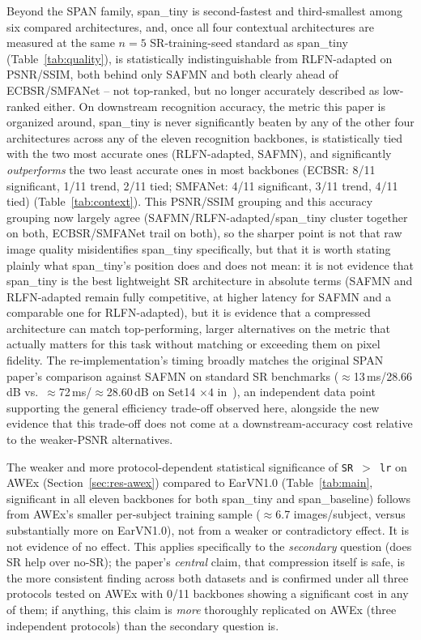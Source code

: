 \documentclass[11pt]{article}
\begin{document}
\label{sec:disc-position}
Beyond the SPAN family, span\_tiny is second-fastest and third-smallest among six compared architectures, and, once all four contextual architectures are measured at the same $n=5$ SR-training-seed standard as span\_tiny (Table~\ref{tab:quality}), is statistically indistinguishable from RLFN-adapted on PSNR/SSIM, both behind only SAFMN and both clearly ahead of ECBSR/SMFANet -- not top-ranked, but no longer accurately described as low-ranked either. On downstream recognition accuracy, the metric this paper is organized around, span\_tiny is never significantly beaten by any of the other four architectures across any of the eleven recognition backbones, is statistically tied with the two most accurate ones (RLFN-adapted, SAFMN), and significantly \emph{outperforms} the two least accurate ones in most backbones (ECBSR: 8/11 significant, 1/11 trend, 2/11 tied; SMFANet: 4/11 significant, 3/11 trend, 4/11 tied) (Table~\ref{tab:context}). This PSNR/SSIM grouping and this accuracy grouping now largely agree (SAFMN/RLFN-adapted/span\_tiny cluster together on both, ECBSR/SMFANet trail on both), so the sharper point is not that raw image quality misidentifies span\_tiny specifically, but that it is worth stating plainly what span\_tiny's position does and does not mean: it is not evidence that span\_tiny is the best lightweight SR architecture in absolute terms (SAFMN and RLFN-adapted remain fully competitive, at higher latency for SAFMN and a comparable one for RLFN-adapted), but it is evidence that a compressed architecture can match top-performing, larger alternatives on the metric that actually matters for this task without matching or exceeding them on pixel fidelity. The re-implementation's timing broadly matches the original SPAN paper's comparison against SAFMN on standard SR benchmarks ($\approx$13\,ms/28.66\,dB vs.\ $\approx$72\,ms/$\approx$28.60\,dB on Set14 $\times4$ in~\cite{wan2024span}), an independent data point supporting the general efficiency trade-off observed here, alongside the new evidence that this trade-off does not come at a downstream-accuracy cost relative to the weaker-PSNR alternatives.

\label{sec:disc-power}
The weaker and more protocol-dependent statistical significance of \texttt{SR $>$ lr} on AWEx (Section~\ref{sec:res-awex}) compared to EarVN1.0 (Table~\ref{tab:main}, significant in all eleven backbones for both span\_tiny and span\_baseline) follows from AWEx's smaller per-subject training sample ($\approx$6.7 images/subject, versus substantially more on EarVN1.0), not from a weaker or contradictory effect. It is not evidence of no effect. This applies specifically to the \emph{secondary} question (does SR help over no-SR); the paper's \emph{central} claim, that compression itself is safe, is the more consistent finding across both datasets and is confirmed under all three protocols tested on AWEx with 0/11 backbones showing a significant cost in any of them; if anything, this claim is \emph{more} thoroughly replicated on AWEx (three independent protocols) than the secondary question is.
\end{document}
